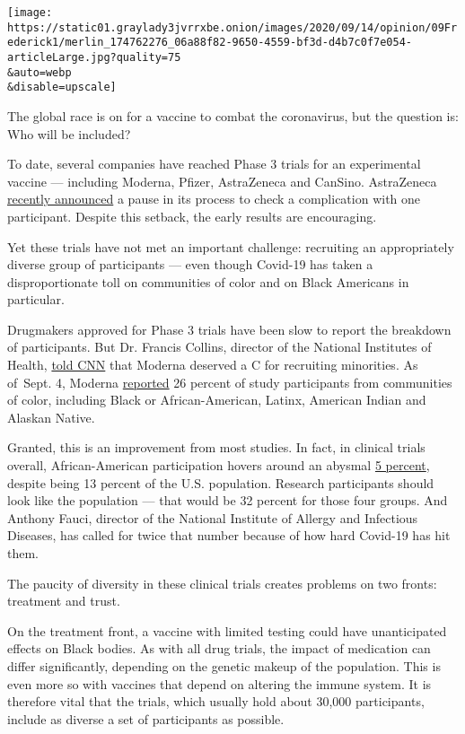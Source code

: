 \texttt{[image: https://static01.graylady3jvrrxbe.onion/images/2020/09/14/opinion/09Frederick1/merlin\_174762276\_06a88f82-9650-4559-bf3d-d4b7c0f7e054-articleLarge.jpg?quality=75\\\&auto=webp\\\&disable=upscale]}

The global race is on for a vaccine to combat the coronavirus, but the
question is: Who will be included?

To date, several companies have reached Phase 3 trials for an
experimental vaccine --- including Moderna, Pfizer, AstraZeneca and
CanSino. AstraZeneca
\href{https://www.statnews.com/2020/09/09/astrazeneca-covid19-vaccine-trial-hold-patient-report/}{recently
announced} a pause in its process to check a complication with one
participant. Despite this setback, the early results are encouraging.

Yet these trials have not met an important challenge: recruiting an
appropriately diverse group of participants --- even though Covid-19 has
taken a disproportionate toll on communities of color and on Black
Americans in particular.

Drugmakers approved for Phase 3 trials have been slow to report the
breakdown of participants. But Dr. Francis Collins, director of the
National Institutes of Health,
\href{https://www.cnn.com/2020/08/16/health/covid-19-vaccine-trial-black-minority-recruitment/index.html}{told
CNN} that Moderna deserved a C for recruiting minorities. As of~Sept. 4,
Moderna \href{https://www.modernatx.com/cove-study}{reported} 26 percent
of study participants from communities of color, including Black or
African-American, Latinx, American Indian and Alaskan Native.

Granted, this is an improvement from most studies. In fact, in clinical
trials overall, African-American participation hovers around an abysmal
\href{https://clinicalresearchpathways.org/diversity/diversity-statistics-infographic/}{5
percent}, despite being 13 percent of the U.S. population. Research
participants should look like the population --- that would be 32
percent for those four groups. And Anthony Fauci, director of the
National Institute of Allergy and Infectious Diseases, has called for
twice that number because of how hard Covid-19 has hit them.

The paucity of diversity in these clinical trials creates problems on
two fronts: treatment and trust.

On the treatment front, a vaccine with limited testing could have
unanticipated effects on Black bodies. As with all drug trials, the
impact of medication can differ significantly, depending on the genetic
makeup of the population. This is even more so with vaccines that depend
on altering the immune system. It is therefore vital that the trials,
which usually hold about 30,000 participants, include as diverse a set
of participants as possible.


